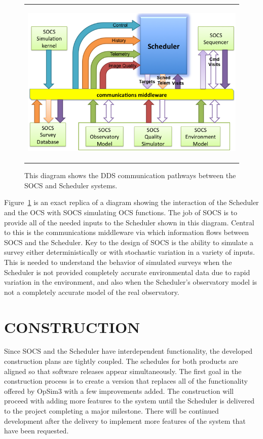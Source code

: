 \documentclass[]{spie}  %
\begin{document}
\begin{figure} [ht]
	\begin{center}
		\begin{tabular}{c}
			\includegraphics[height=8cm]{CommFlow.png}
		\end{tabular}
	\end{center}
	\caption[example]
	{ \label{fig:commflow} 
		This diagram shows the DDS communication pathways between the SOCS and Scheduler systems.}
\end{figure}

Figure~\ref*{fig:commflow} is an exact replica of a diagram showing the interaction of the Scheduler and the OCS with SOCS simulating OCS functions. The job of SOCS is to provide all of the needed inputs to the Scheduler shown in this diagram. Central to this is the communications middleware via which information flows between SOCS and the Scheduler. Key to the design of SOCS is the ability to simulate a survey either deterministically or with stochastic variation in a variety of inputs. This is needed to understand the behavior of simulated surveys when the Scheduler is not provided completely accurate environmental data due to rapid variation in the environment, and also when the Scheduler's observatory model is not a completely accurate model of the real observatory.

\section{CONSTRUCTION}
\label{sec:construction}

Since SOCS and the Scheduler have interdependent functionality, the developed construction plans are tightly coupled. The schedules for both products are aligned so that software releases appear simultaneously. The first goal in the construction process is to create a version that replaces all of the functionality offered by OpSim3 with a few improvements added. The construction will proceed with adding more features to the system until the Scheduler is delivered to the project completing a major milestone. There will be continued development after the delivery to implement more features of the system that have been requested. 
\end{document}
